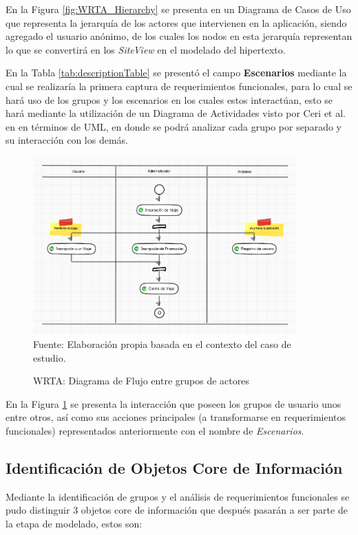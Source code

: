 \documentclass[oneside,12pt,a4paper]{memoir}%
\begin{document}
	    En la Figura \ref{fig:WRTA_Hierarchy} se presenta en un Diagrama de Casos
	    de Uso que representa la jerarqu\'ia de los actores que intervienen en la
	    aplicaci\'on, siendo agregado el usuario an\'onimo, de los cuales los nodos
	    en esta jerarqu\'ia representan lo que se convertir\'a en los
	    \textit{SiteView} en el modelado del hipertexto.
	    
	    En la Tabla \ref{tab:descriptionTable} se present\'o el campo
	    \textbf{Escenarios} mediante la cual se realizar\'ia la primera captura de
	    requerimientos funcionales, para lo cual se har\'a uso de los grupos y los
	    escenarios en los cuales estos interact\'uan, esto se har\'a mediante la
	    utilizaci\'on de un Diagrama de Actividades visto por Ceri et al. en
	    \cite{Matera2003} en t\'erminos de \ac{UML}, en donde se podr\'a analizar
	    cada grupo por separado y su interacci\'on con los dem\'as.
	    
	    \begin{figure}[here]
			\centering 
			\caption{WRTA: Diagrama de Flujo entre grupos de actores}
			\includegraphics[width=0.9\textwidth]{figure/fig_WRTA_flowDiagram.png}
			\newline
			Fuente: Elaboraci\'on propia basada en el contexto del caso de estudio.
			\label{fig:WRTA_flowDiagram}
		\end{figure}

		En la Figura \ref{fig:WRTA_flowDiagram} se presenta la interacci\'on que poseen
		los grupos de usuario unos entre otros, as\'i como sus acciones principales (a
		transformarse en requerimientos funcionales) representados anteriormente con
		el nombre de \textit{Escenarios}.
 
	    
		\subsection{Identificaci\'on de Objetos Core de Informaci\'on}
		\label{ssec:coreObjects}
		Mediante la identificaci\'on de grupos y el an\'alisis de requerimientos
		funcionales se pudo distinguir $3$ objetos core de informaci\'on que despu\'es
		pasar\'an a ser parte de la etapa de modelado, estos son:
		
\end{document}
